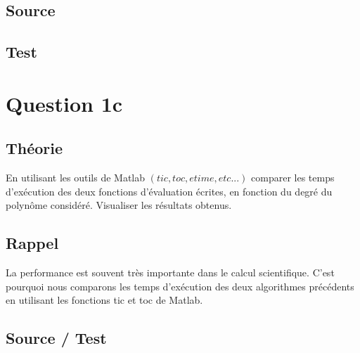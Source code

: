 \documentclass[a4paper,10pt]{report}
\begin{document}
\newpage
\subsection*{Source}



\subsection*{Test}

\begin{center}
	
\end{center}

\section*{Question 1c}

\subsection*{Théorie}

En utilisant les outils de Matlab $(tic, toc, etime, etc...)$ comparer les temps
d’exécution des deux fonctions d’évaluation écrites, en fonction du degré
du polynôme considéré. Visualiser les résultats obtenus.

\subsection*{Rappel}

La performance est souvent très importante dans le calcul scientifique. C’est pourquoi nous comparons les temps d’exécution des deux algorithmes précédents en utilisant les fonctions tic et toc de Matlab.

\subsection*{Source / Test}

\begin{center}
	
\end{center}
\end{document}
